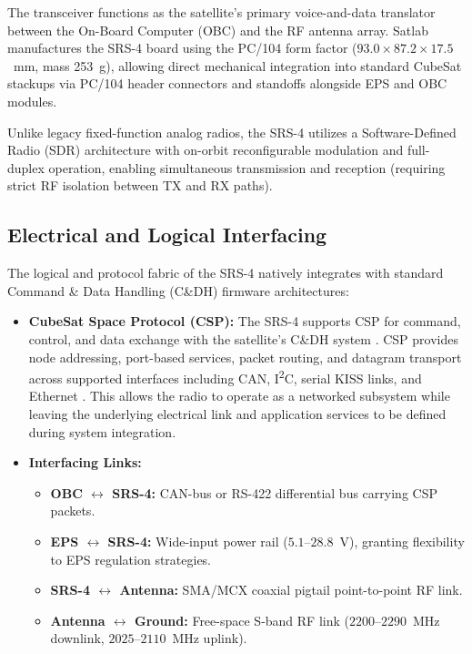 \documentclass[10pt]{../datasheet}
\let\cite\citep
\begin{document}
The transceiver functions as the satellite's primary voice-and-data translator
between the On-Board Computer (OBC) and the RF antenna array. Satlab
manufactures the SRS-4 board using the PC/104 form factor ($93.0 \times 87.2
  \times 17.5$~mm, mass 253~g), allowing direct mechanical integration into
standard CubeSat stackups via PC/104 header connectors and standoffs alongside
EPS and OBC modules.

Unlike legacy fixed-function analog radios, the SRS-4 utilizes a
Software-Defined Radio (SDR) architecture with on-orbit reconfigurable
modulation and full-duplex operation, enabling simultaneous transmission and
reception (requiring strict RF isolation between TX and RX paths).

\subsection{Electrical and Logical Interfacing}
The logical and protocol fabric of the SRS-4 natively integrates with standard
Command \& Data Handling (C\&DH) firmware architectures:
\begin{itemize}
  \item \textbf{CubeSat Space Protocol (CSP):} The SRS-4 supports CSP for
        command, control, and data exchange with the satellite's C\&DH system
        \cite{satlab_srs4}. CSP provides node addressing, port-based services,
        packet routing, and datagram transport across supported interfaces
        including CAN, I\textsuperscript{2}C, serial KISS links, and Ethernet
        \cite{libcsp_basics,libcsp_protocol_stack}. This allows the radio to
        operate as a networked subsystem while leaving the underlying
        electrical link and application services to be defined during system
        integration.
  \item \textbf{Interfacing Links:}
        \begin{itemize}
          \item \textbf{OBC $\leftrightarrow$ SRS-4:} CAN-bus or RS-422
                differential bus carrying CSP packets.
          \item \textbf{EPS $\leftrightarrow$ SRS-4:} Wide-input power rail
                ($5.1$--$28.8$~V), granting flexibility to EPS regulation strategies.
          \item \textbf{SRS-4 $\leftrightarrow$ Antenna:} SMA/MCX coaxial
                pigtail point-to-point RF link.
          \item \textbf{Antenna $\leftrightarrow$ Ground:} Free-space S-band RF
                link ($2200$--$2290$~MHz downlink, $2025$--$2110$~MHz uplink).
        \end{itemize}
\end{itemize}
\end{document}
